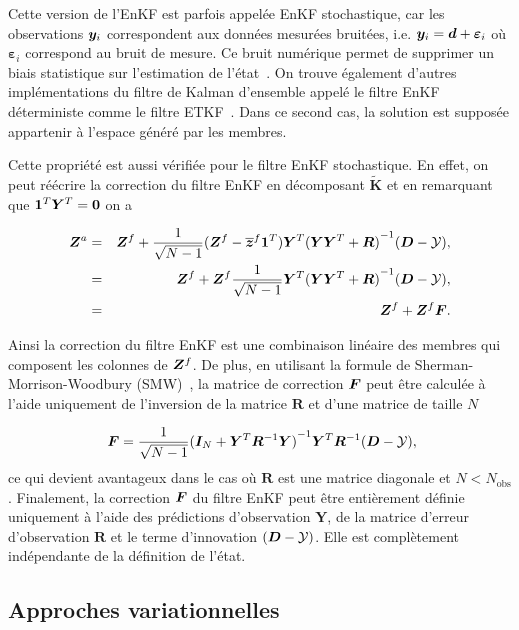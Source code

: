 Cette version de l'EnKF est parfois appelée EnKF stochastique, car les observations $\bm{y}_i$ correspondent aux données mesurées bruitées, i.e. $\bm{y}_i = \bm{d} + \bm \varepsilon_i$ où $\bm \varepsilon_i$ correspond au bruit de mesure. Ce bruit numérique permet de supprimer un biais statistique sur l'estimation de l'état~\cite{van_leeuwen_consistent_2020}. On trouve également d'autres implémentations du filtre de Kalman d'ensemble appelé le filtre EnKF déterministe comme le filtre ETKF~\cite{bishop_adaptive_2001, Hunt2007}. Dans ce second cas, la solution est supposée appartenir à l'espace généré par les membres.

Cette propriété est aussi vérifiée pour le filtre EnKF stochastique. En effet, on peut réécrire la correction du filtre EnKF en décomposant $\tilde{\bm{K}}$ et en remarquant que $\bm 1^T \bm Y^T = \bm 0$ on a

\begin{eqnarray*}
    \bm{Z}^a &=& \bm{Z}^f + \frac{1}{\sqrt{N - 1}}(\bm Z^f - \overline{\bm{z}}^f \bm{1}^T)\bm Y^T {(\bm Y \bm Y^T + \bm R)}^{-1} ( \bm{D} - \mathcal{Y}), \\
    &=& \bm{Z}^f +\bm Z^f  \frac{1}{\sqrt{N - 1}}\bm Y^T {(\bm Y \bm Y^T + \bm R)}^{-1} ( \bm{D} - \mathcal{Y}), \\
    &=& \bm{Z}^f +\bm Z^f \bm{F}.
\end{eqnarray*}

Ainsi la correction du filtre EnKF est une combinaison linéaire des membres qui composent les colonnes de $\bm{Z}^f$. De plus, en utilisant la formule de Sherman-Morrison-Woodbury (SMW)~\cite{SMW}, la matrice de correction $\bm{F}$ peut être calculée à l'aide uniquement de l'inversion de la matrice $\bm R$ et d'une matrice de taille $N$

\begin{eqnarray}~\label{eq:corr}
    \bm{F} = \frac{1}{\sqrt{N - 1}} {(\bm I_N + \bm Y^T\bm R^{-1}\bm Y)}^{-1}\bm Y^T \bm R^{-1} (\bm{D} - \mathcal{Y}),
\end{eqnarray}ce qui devient avantageux dans le cas où $\bm R$ est une matrice diagonale et $N < N_{\text{obs}}$. Finalement, la correction $\bm{F}$ du filtre EnKF peut être entièrement définie uniquement à l'aide des prédictions d'observation $\bm Y$, de la matrice d'erreur d'observation $\bm R$ et le terme d'innovation $(\bm{D} - \mathcal{Y})$. Elle est complètement indépendante de la définition de l'état.

\subsection{Approches variationnelles}~\label{sec:variation}


